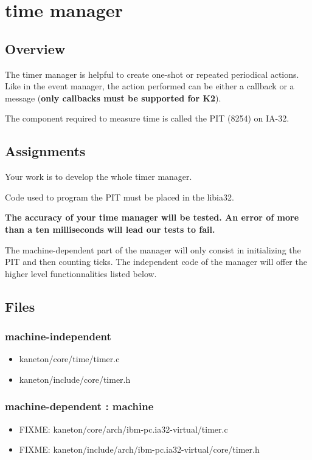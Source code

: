 \section{time manager}
\subsection*{Overview}

The timer manager is helpful to create one-shot or repeated
periodical actions. Like in the event manager, the action
performed can be either a callback or a message (\textbf{only
  callbacks must be supported for K2}).

The component required to measure time is called the PIT (8254) on
IA-32.

\subsection*{Assignments}

Your work is to develop the whole timer manager.

Code used to program the PIT must be placed in the libia32.

\textbf{The accuracy of your time manager will be tested. An error
  of more than a ten milliseconds will lead our tests to fail.}

The machine-dependent part of the manager will only consist in
initializing the PIT and then counting ticks. The independent code
of the manager will offer the higher level functionnalities listed
below.

\subsection*{Files}
\subsubsection{\color{filerefcolor} machine-independent}
\begin{itemize}
\item kaneton/core/time/timer.c
\item kaneton/include/core/timer.h
\end{itemize}

\subsubsection{\color{filerefcolor} machine-dependent : machine}
\begin{itemize}
\item FIXME: kaneton/core/arch/ibm-pc.ia32-virtual/timer.c
\item FIXME: kaneton/include/arch/ibm-pc.ia32-virtual/core/timer.h
\end{itemize}

